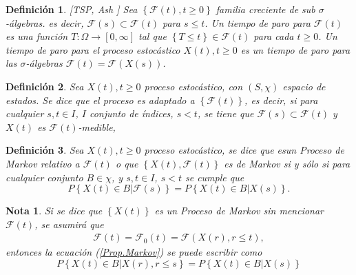 \documentclass{article}
\newtheorem{Def}{Definición}[section]
\newtheorem{Note}{Nota}[section]
\numberwithin{equation}{section}
\begin{document}
\begin{Def}\label{Def.Tiempo.Paro}[TSP, Ash \cite{RBA}]
Sea $\left\{\mathcal{F}\left(t\right),t\geq0\right\}$ familia creciente de sub $\sigma$-\'algebras. es decir, $\mathcal{F}\left(s\right)\subset\mathcal{F}\left(t\right)$ para $s\leq t$. Un tiempo de paro para $\mathcal{F}\left(t\right)$ es una funci\'on $T:\Omega\rightarrow\left[0,\infty\right]$ tal que $\left\{T\leq t\right\}\in\mathcal{F}\left(t\right)$ para cada $t\geq0$. Un tiempo de paro para el proceso estoc\'astico $X\left(t\right),t\geq0$ es un tiempo de paro para las $\sigma$-\'algebras $\mathcal{F}\left(t\right)=\mathcal{F}\left(X\left(s\right)\right)$.
\end{Def}

\begin{Def}
Sea $X\left(t\right),t\geq0$ proceso estoc\'astico, con $\left(S,\chi\right)$ espacio de estados. Se dice que el proceso es adaptado a $\left\{\mathcal{F}\left(t\right)\right\}$, es decir, si para cualquier $s,t\in I$, $I$ conjunto de \'indices, $s<t$, se tiene que $\mathcal{F}\left(s\right)\subset\mathcal{F}\left(t\right)$ y $X\left(t\right)$ es $\mathcal{F}\left(t\right)$-medible,
\end{Def}

\begin{Def}
Sea $X\left(t\right),t\geq0$ proceso estoc\'astico, se dice que esun Proceso de Markov relativo a $\mathcal{F}\left(t\right)$ o que $\left\{X\left(t\right),\mathcal{F}\left(t\right)\right\}$ es de Markov si y s\'olo si para cualquier conjunto $B\in\chi$,  y $s,t\in I$, $s<t$ se cumple que
\begin{equation}\label{Prop.Markov}
P\left\{X\left(t\right)\in B|\mathcal{F}\left(s\right)\right\}=P\left\{X\left(t\right)\in B|X\left(s\right)\right\}.
\end{equation}
\end{Def}

\begin{Note}
Si se dice que $\left\{X\left(t\right)\right\}$ es un Proceso de Markov sin mencionar $\mathcal{F}\left(t\right)$, se asumir\'a que 
\begin{eqnarray*}
\mathcal{F}\left(t\right)=\mathcal{F}_{0}\left(t\right)=\mathcal{F}\left(X\left(r\right),r\leq t\right),
\end{eqnarray*}
entonces la ecuaci\'on (\ref{Prop.Markov}) se puede escribir como
\begin{equation}
P\left\{X\left(t\right)\in B|X\left(r\right),r\leq s\right\} = P\left\{X\left(t\right)\in B|X\left(s\right)\right\}
\end{equation}
\end{Note}
\end{document}
